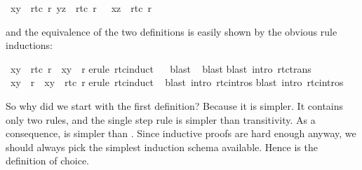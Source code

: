 \begin{isabellebody}
{\isachardoublequoteopen}{\isasymlbrakk}\ {\isacharparenleft}x{\isacharcomma}y{\isacharparenright}\ {\isasymin}\ rtc{}\ r{\isacharsemicolon}\ {\isacharparenleft}y{\isacharcomma}z{\isacharparenright}\ {\isasymin}\ rtc{}\ r\ {\isasymrbrakk}\ {\isasymLongrightarrow}\ {\isacharparenleft}x{\isacharcomma}z{\isacharparenright}\ {\isasymin}\ rtc{}\ r{\isachardoublequoteclose}%
\begin{isamarkuptext}%
\noindent
and the equivalence of the two definitions is easily shown by the obvious rule
inductions:%
\end{isamarkuptext}%
\isamarkuptrue%
\isamarkupfalse%
\ {\isachardoublequoteopen}{\isacharparenleft}x{\isacharcomma}y{\isacharparenright}\ {\isasymin}\ rtc{}\ r\ {\isasymLongrightarrow}\ {\isacharparenleft}x{\isacharcomma}y{\isacharparenright}\ {\isasymin}\ r{\isacharasterisk}{\isachardoublequoteclose}\isanewline
%
\isadelimproof
%
\endisadelimproof
%
\isatagproof
{}\isamarkupfalse%
{\isacharparenleft}erule\ rtc{}{\isachardot}induct{\isacharparenright}\isanewline
\ \ \isamarkupfalse%
{\isacharparenleft}blast{\isacharparenright}\isanewline
\ \isamarkupfalse%
{\isacharparenleft}blast{\isacharparenright}\isanewline
{}\isamarkupfalse%
{\isacharparenleft}blast\ intro{\isacharcolon}\ rtc{\isacharunderscore}trans{\isacharparenright}\isanewline
{}\isamarkupfalse%
%
\endisatagproof
{\isafoldproof}%
%
\isadelimproof
\isanewline
%
\endisadelimproof
\isanewline
{}\isamarkupfalse%
\ {\isachardoublequoteopen}{\isacharparenleft}x{\isacharcomma}y{\isacharparenright}\ {\isasymin}\ r{\isacharasterisk}\ {\isasymLongrightarrow}\ {\isacharparenleft}x{\isacharcomma}y{\isacharparenright}\ {\isasymin}\ rtc{}\ r{\isachardoublequoteclose}\isanewline
%
\isadelimproof
%
\endisadelimproof
%
\isatagproof
{}\isamarkupfalse%
{\isacharparenleft}erule\ rtc{\isachardot}induct{\isacharparenright}\isanewline
\ \isamarkupfalse%
{\isacharparenleft}blast\ intro{\isacharcolon}\ rtc{}{\isachardot}intros{\isacharparenright}\isanewline
{}\isamarkupfalse%
{\isacharparenleft}blast\ intro{\isacharcolon}\ rtc{}{\isachardot}intros{\isacharparenright}\isanewline
{}\isamarkupfalse%
%
\endisatagproof
{\isafoldproof}%
%
\isadelimproof
%
\endisadelimproof
%
\begin{isamarkuptext}%
So why did we start with the first definition? Because it is simpler. It
contains only two rules, and the single step rule is simpler than
transitivity.  As a consequence,  is simpler than
. Since inductive proofs are hard enough
anyway, we should always pick the simplest induction schema available.
Hence  is the definition of choice.


\end{isamarkuptext}
\end{isabellebody}
